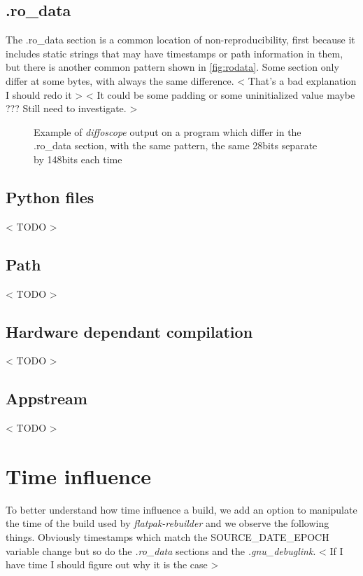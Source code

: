\documentclass[a4paper,11pt,oneside]{report}
\newcommand{\sysname}{\emph{flatpak-rebuilder}\xspace}
\newcommand{\sde}{SOURCE\_DATE\_EPOCH\xspace}
\newcommand{\dfc}{\emph{diffoscope}\xspace}
\begin{document}
\subsection{.ro\_data}
The .ro\_data section is a common location of non-reproducibility, first
because it includes static strings that may have timestamps or path information
in them, but there is another common pattern shown in \autoref{fig:rodata}.
Some section only differ at some bytes, with always the same difference.
< That's a bad explanation I should redo it >
< It could be some padding or some uninitialized value maybe ??? Still need to investigate. >
\begin{figure}[h]
    \caption{Example of \dfc output on a program which differ in the .ro\_data section, with the same pattern, the same 28bits separate by 148bits each time}
    \label{fig:rodata}
\end{figure}

\subsection{Python files}
< TODO >

\subsection{Path}
< TODO >

\subsection{Hardware dependant compilation}
< TODO >

\subsection{Appstream}
< TODO >

\section{Time influence}
To better understand how time influence a build, we add an option to manipulate
the time of the build used by \sysname and we observe the following things.
Obviously timestamps which match the \sde variable change but so do the
\emph{.ro\_data} sections and the \emph{.gnu\_debuglink}.
< If I have time I should figure out why it is the case >
\end{document}

